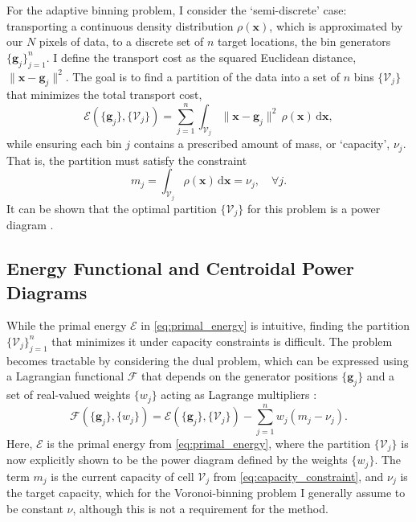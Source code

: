 \documentclass[fleqn,usenatbib]{mnras}
\newcommand{\dd}{\mathrm{d}}
\newcommand{\norm}[1]{\lVert#1\rVert}
\begin{document}
For the adaptive binning problem, I consider the `semi-discrete' case: transporting a continuous density distribution $\rho(\mathbf{x})$, which is approximated by our $N$ pixels of data, to a discrete set of $n$ target locations, the bin generators $\{\mathbf{g}_j\}_{j=1}^n$. I define the transport cost as the squared Euclidean distance, $\norm{\mathbf{x} - \mathbf{g}_j}^2$. The goal is to find a partition of the data into a set of $n$ bins $\{\mathcal{V}_j\}$ that minimizes the total transport cost,
\begin{equation}
\mathcal{E}(\{\mathbf{g}_j\}, \{\mathcal{V}_j\}) = \sum_{j=1}^n \int_{\mathcal{V}_j} \norm{\mathbf{x}-\mathbf{g}_j}^2\,\rho(\mathbf{x})\,\dd\mathbf{x},
\label{eq:primal_energy}
\end{equation}
while ensuring each bin $j$ contains a prescribed amount of mass, or `capacity', $\nu_j$. That is, the partition must satisfy the constraint
\begin{equation}
m_j = \int_{\mathcal{V}_j} \rho(\mathbf{x})\,\dd\mathbf{x} = \nu_j, \quad \forall j.
\label{eq:capacity_constraint}
\end{equation}
It can be shown that the optimal partition $\{\mathcal{V}_j\}$ for this problem is a power diagram \citep[e.g.,][]{Aurenhammer1998}.

\subsection{Energy Functional and Centroidal Power Diagrams}

While the primal energy $\mathcal{E}$ in \autoref{eq:primal_energy} is intuitive, finding the partition $\{\mathcal{V}_j\}_{j=1}^n$ that minimizes it under capacity constraints is difficult. The problem becomes tractable by considering the dual problem, which can be expressed using a Lagrangian functional $\mathcal{F}$ that depends on the generator positions $\{\mathbf{g}_j\}$ and a set of real-valued weights $\{w_j\}$ acting as Lagrange multipliers \citep{Aurenhammer1998,Merigot2011,DeGoes2012,Levy2015}:
\begin{equation}
\mathcal{F}(\{\mathbf{g}_j\}, \{w_j\}) = \mathcal{E}(\{\mathbf{g}_j\}, \{\mathcal{V}_j\}) - \sum_{j=1}^n w_j (m_j - \nu_j).
\label{eq:dual_energy}
\end{equation}
Here, $\mathcal{E}$ is the primal energy from \autoref{eq:primal_energy}, where the partition $\{\mathcal{V}_j\}$ is now explicitly shown to be the power diagram defined by the weights $\{w_j\}$. The term $m_j$ is the current capacity of cell $\mathcal{V}_j$ from \autoref{eq:capacity_constraint}, and $\nu_j$ is the target capacity, which for the Voronoi-binning problem I generally assume to be constant $\nu$, although this is not a requirement for the method.
\end{document}
